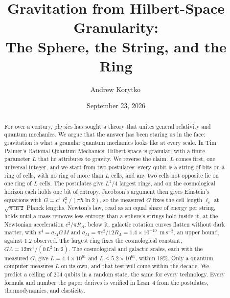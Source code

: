 \documentclass[aps,prd,twocolumn,superscriptaddress,nofootinbib,showkeys]{revtex4-2}
\newcommand{\lc}{\ell_c}
\newcommand{\RL}{R_\Lambda}
\begin{document}
\title{Gravitation from Hilbert-Space Granularity:\\ The Sphere, the String, and the Ring}

\author{Andrew Korytko\,}

\date{September 23, 2026}

\begin{abstract}
For over a century, physics has sought a theory that unites general relativity and quantum mechanics. We argue that the answer has been staring us in the face: gravitation is what a granular quantum mechanics looks like at every scale. In Tim Palmer's Rational Quantum Mechanics, Hilbert space is granular, with a finite parameter $L$ that he attributes to gravity. We reverse the claim. $L$ comes first, one universal integer, and we start from two postulates: every qubit is a string of bits on a ring of cells, with no ring of more than $L$ cells, and any two cells not opposite lie on one ring of $L$ cells. The postulates give $L^2/4$ largest rings, and on the cosmological horizon each holds one bit of entropy. Jacobson's argument then gives Einstein's equations with $G = c^3\lc^2/(\pi\hbar\ln2)$, so the measured $G$ fixes the cell length $\lc$ at $\sqrt{\pi\ln2}$ Planck lengths. Newton's law, read as an equal share of energy per string, holds until a mass removes less entropy than a sphere's strings hold inside it, at the Newtonian acceleration $c^2/\pi\RL$; below it, galactic rotation curves flatten without dark matter, with $v^4 = a_MGM$ and $a_M = \pi c^2/12\RL = 1.4\times10^{-10}$~m\,s$^{-2}$, an upper bound, against $1.2$ observed. The largest ring fixes the cosmological constant, $G\Lambda = 12\pi c^3/(\hbar L^2\ln2)$. The cosmological and galactic scales, each with the measured $G$, give $L = 4.4\times10^{61}$ and $L \le 5.2\times10^{61}$, within 18\%. Only a quantum computer measures $L$ on its own, and that test will come within the decade. We predict a ceiling of $204$ qubits in a random state, the same for every technology. Every formula and number the paper derives is verified in Lean~4 from the postulates, thermodynamics, and elasticity.
\end{abstract}


\maketitle
\end{document}
